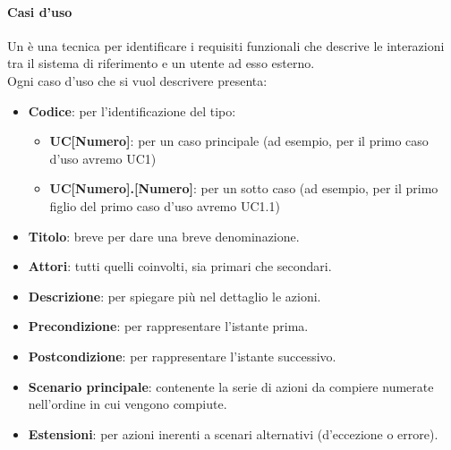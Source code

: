		\paragraph{Casi d'uso}\label{PP:Sviluppo:AdR:CasiUso}
		Un  è una tecnica per identificare i requisiti funzionali che descrive le interazioni tra il sistema di riferimento e un utente ad esso esterno. \\
		Ogni caso d'uso che si vuol descrivere presenta:
		\begin{itemize}
		 	\item \textbf{Codice}: per l'identificazione del tipo:
		 	\begin{itemize}
		 		\item \textbf{UC[Numero]}: per un caso principale (ad esempio, per il primo caso d'uso avremo UC1)
		 		\item \textbf{UC[Numero].[Numero]}: per un sotto caso (ad esempio, per il primo figlio del primo caso d'uso avremo UC1.1)
		 	\end{itemize}
		 	\item \textbf{Titolo}: breve per dare una breve denominazione.
		 	\item \textbf{Attori}: tutti quelli coinvolti, sia primari che secondari.
		 	\item \textbf{Descrizione}: per spiegare più nel dettaglio le azioni.
		 	\item \textbf{Precondizione}: per rappresentare l'istante prima.
		 	\item \textbf{Postcondizione}: per rappresentare l'istante successivo.
		 	\item \textbf{Scenario principale}: contenente la serie di azioni da compiere numerate nell'ordine in cui vengono compiute.
		 	\item \textbf{Estensioni}: per azioni inerenti a scenari alternativi (d'eccezione o errore).
		\end{itemize}
	 	 






